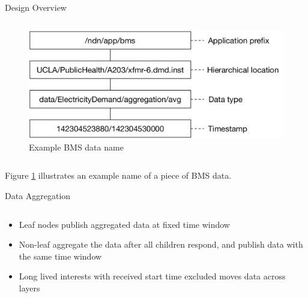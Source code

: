 \documentclass[final,hyperref={pdfpagelabels=false},20pt]{beamer}
\begin{document}
\begin{frame}[t]
\begin{columns}[t]
\begin{column}{.465\textwidth}
\begin{block}{Design Overview}
\begin{columns}[T]
\begin{column}{.55\textwidth}
\begin{figure}
\includegraphics[width=\linewidth]{bms-example-name}
\caption{Example BMS data name}
\label{fig:example-name}
\end{figure}
\end{column}

\end{columns}

\vspace{15mm}

Figure \ref{fig:example-name} illustrates an example name of a piece of BMS data.

\end{block}


\begin{block}{Data Aggregation}

\begin{columns}[T]

\begin{column}{.42\textwidth}
\begin{itemize}
\item{Leaf nodes publish aggregated data at fixed time window}
\item{Non-leaf aggregate the data after all children respond, and publish data with the same time window}
\item{Long lived interests with received start time excluded moves data across layers}
\end{itemize}
\end{column}


\end{columns}
\end{block}
\end{column}
\end{columns}
\end{frame}
\end{document}
